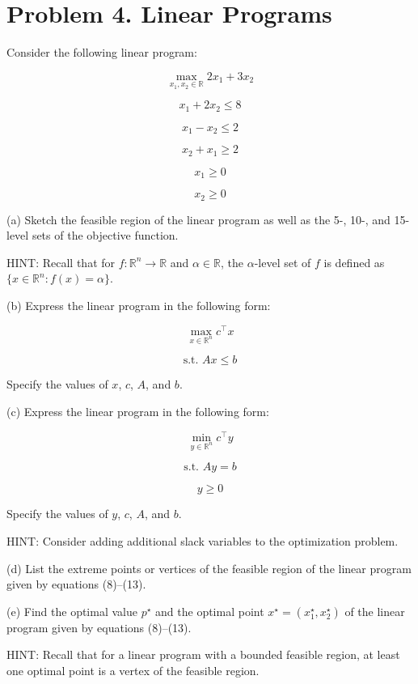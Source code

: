 \documentclass[
	12pt,
]{fphw}
\begin{document}
\newpage
\section*{Problem 4. Linear Programs}

Consider the following linear program:

\[
\max_{x_1,x_2 \in \mathbb{R}} 2x_1 + 3x_2 \tag{8}
\]

\[
x_1 + 2x_2 \le 8 \tag{9}
\]

\[
x_1 - x_2 \le 2 \tag{10}
\]

\[
x_2 + x_1 \ge 2 \tag{11}
\]

\[
x_1 \ge 0 \tag{12}
\]

\[
x_2 \ge 0 \tag{13}
\]

(a) Sketch the feasible region of the linear program as well as the 5-, 10-, and 15-level sets of the objective
function.

HINT: Recall that for \(f : \mathbb{R}^n \to \mathbb{R}\) and \(\alpha \in \mathbb{R}\), the \(\alpha\)-level set of \(f\)
is defined as \(\{x \in \mathbb{R}^n : f(x) = \alpha\}\).

(b) Express the linear program in the following form:

\[
\max_{x \in \mathbb{R}^n} c^\top x \tag{14}
\]

\[
\text{s.t. } Ax \le b \tag{15}
\]

Specify the values of \(x\), \(c\), \(A\), and \(b\).

(c) Express the linear program in the following form:

\[
\min_{y \in \mathbb{R}^n} c^\top y \tag{16}
\]

\[
\text{s.t. } Ay = b \tag{17}
\]

\[
y \ge 0 \tag{18}
\]

Specify the values of \(y\), \(c\), \(A\), and \(b\).

HINT: Consider adding additional slack variables to the optimization problem.

(d) List the extreme points or vertices of the feasible region of the linear program given by equations (8)–(13).

(e) Find the optimal value \(p^\star\) and the optimal point
\(x^\star = (x_1^\star, x_2^\star)\) of the linear program given by equations (8)–(13).

HINT: Recall that for a linear program with a bounded feasible region, at least one optimal point is a vertex
of the feasible region.
\end{document}

